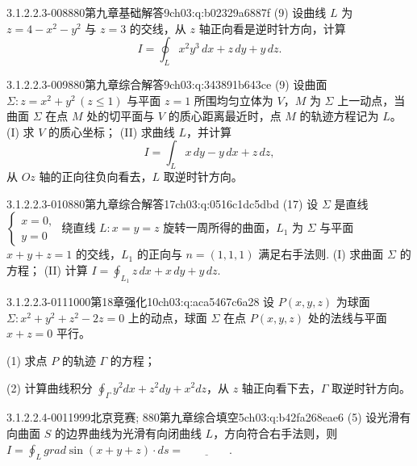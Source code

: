 \begin{q}{3.1.2.2.3-008}{880第九章基础解答9}{ch03:q:b02329a6887f}
(9) 设曲线 $L$ 为 $z=4-x^2-y^2$ 与 $z=3$ 的交线，从 $z$ 轴正向看是逆时针方向，计算
\[I=\oint_L x^2y^3\,dx+z\,dy+y\,dz.\]
\end{q}

\begin{q}{3.1.2.2.3-009}{880第九章综合解答9}{ch03:q:343891b643ce}
(9) 设曲面 $\Sigma:z=x^2+y^2\,(z\le 1)$ 与平面 $z=1$ 所围均匀立体为 $V$，$M$ 为 $\Sigma$ 上一动点，当曲面 $\Sigma$ 在点 $M$ 处的切平面与 $V$ 的质心距离最近时，点 $M$ 的轨迹方程记为 $L$。
(I) 求 $V$ 的质心坐标；
(II) 求曲线 $L$，并计算
\[
I=\int_L x\,dy-y\,dx+z\,dz,
\]
从 $Oz$ 轴的正向往负向看去，$L$ 取逆时针方向。
\end{q}

\begin{q}{3.1.2.2.3-010}{880第九章综合解答17}{ch03:q:0516c1dc5dbd}
(17) 设 $\Sigma$ 是直线 $\begin{cases}x=0,\\ y=0\end{cases}$ 绕直线 $L:x=y=z$ 旋转一周所得的曲面，$L_1$ 为 $\Sigma$ 与平面 $x+y+z=1$ 的交线，$L_1$ 的正向与 $n=(1,1,1)$ 满足右手法则.
(I) 求曲面 $\Sigma$ 的方程；
(II) 计算 $\displaystyle I=\oint_{L_1} z\,dx+x\,dy+y\,dz$.
\end{q}

\begin{q}{3.1.2.2.3-011}{1000第18章强化10}{ch03:q:aca5467c6a28}
设 $P(x,y,z)$ 为球面 $\Sigma: x^2+y^2+z^2-2z=0$ 上的动点，球面 $\Sigma$ 在点 $P(x,y,z)$ 处的法线与平面 $x+z=0$ 平行。

(1) 求点 $P$ 的轨迹 $\Gamma$ 的方程；

(2) 计算曲线积分 $\displaystyle \oint_{\Gamma} y^2dx+z^2dy+x^2dz$，从 $z$ 轴正向看下去，$\Gamma$ 取逆时针方向。
\end{q}

\par\addvspace{2.4ex}\noindent
\begin{minipage}{\linewidth}

\begin{q}{3.1.2.2.4-001}{1999北京竞赛; 880第九章综合填空5}{ch03:q:b42fa268eae6}
(5) 设光滑有向曲面 $S$ 的边界曲线为光滑有向闭曲线 $L$，方向符合右手法则，则 $\displaystyle I=\oint_L grad\sin(x+y+z)\cdot ds=\underline{\hspace{4em}}$.
\end{q}
\end{minipage}



